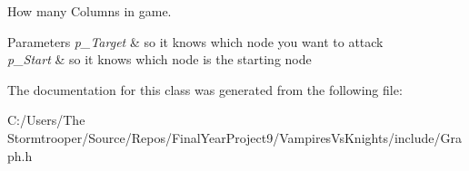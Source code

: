 How many Columns in game. 


\begin{DoxyParams}{Parameters}
{\em p\+\_\+\+Target} & so it knows which node you want to attack \\
\hline
{\em p\+\_\+\+Start} & so it knows which node is the starting node \\
\hline
\end{DoxyParams}


The documentation for this class was generated from the following file\+:\begin{DoxyCompactItemize}
\item 
C\+:/\+Users/\+The Stormtrooper/\+Source/\+Repos/\+Final\+Year\+Project9/\+Vampires\+Vs\+Knights/include/Graph.\+h\end{DoxyCompactItemize}
